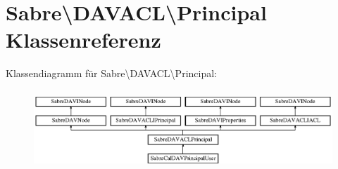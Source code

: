 \hypertarget{class_sabre_1_1_d_a_v_a_c_l_1_1_principal}{}\section{Sabre\textbackslash{}D\+A\+V\+A\+CL\textbackslash{}Principal Klassenreferenz}
\label{class_sabre_1_1_d_a_v_a_c_l_1_1_principal}
Klassendiagramm für Sabre\textbackslash{}D\+A\+V\+A\+CL\textbackslash{}Principal\+:\begin{figure}[H]
\begin{center}
\leavevmode
\includegraphics[height=2.978724cm]{class_sabre_1_1_d_a_v_a_c_l_1_1_principal}
\end{center}
\end{figure}
